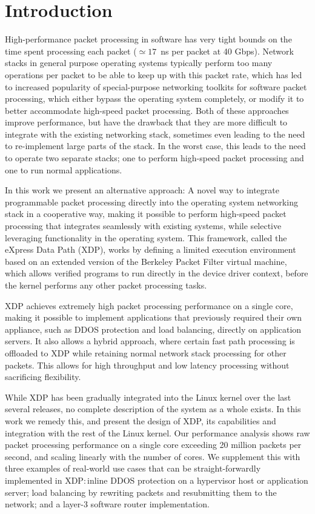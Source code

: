 \documentclass[10pt,sigconf]{acmart}
\begin{document}
\section{Introduction}%
\label{sec:introduction}
High-performance packet processing in software has very tight bounds on the time
spent processing each packet ($\simeq17$~ns per packet at 40 Gbps). Network
stacks in general purpose operating systems typically perform too many
operations per packet to be able to keep up with this packet rate, which has led
to increased popularity of special-purpose networking toolkits for software
packet processing, which either bypass the operating system completely, or
modify it to better accommodate high-speed packet processing. Both of these
approaches improve performance, but have the drawback that they are more
difficult to integrate with the existing networking stack, sometimes even
leading to the need to re-implement large parts of the stack. In the worst case,
this leads to the need to operate two separate stacks; one to perform high-speed
packet processing and one to run normal applications.

In this work we present an alternative approach: A novel way to integrate
programmable packet processing directly into the operating system networking
stack in a cooperative way, making it possible to perform high-speed packet
processing that integrates seamlessly with existing systems, while selective
leveraging functionality in the operating system. This framework, called the
eXpress Data Path (XDP), works by defining a limited execution environment based
on an extended version of the Berkeley Packet Filter virtual machine, which
allows verified programs to run directly in the device driver context, before
the kernel performs any other packet processing tasks.

XDP achieves extremely high packet processing performance on a single core,
making it possible to implement applications that previously required their own
appliance, such as DDOS protection and load balancing, directly on application
servers. It also allows a hybrid approach, where certain fast path processing is
offloaded to XDP while retaining normal network stack processing for other
packets. This allows for high throughput and low latency processing without
sacrificing flexibility.

While XDP has been gradually integrated into the Linux kernel over the last
several releases, no complete description of the system as a whole exists. In
this work we remedy this, and present the design of XDP, its capabilities and
integration with the rest of the Linux kernel. Our performance analysis shows
raw packet processing performance on a single core exceeding 20 million packets
per second, and scaling linearly with the number of cores. We supplement this
with three examples of real-world use cases that can be straight-forwardly
implemented in XDP:\,inline DDOS protection on a hypervisor host or application
server; load balancing by rewriting packets and resubmitting them to the
network; and a layer-3 software router implementation.
\end{document}
